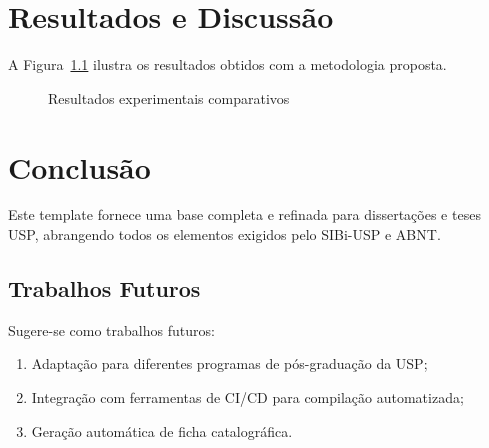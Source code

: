 \documentclass[
    12pt,                   %
    a4paper,                %
    openright,              %
    oneside,                %
    english,                %
    brazil                  %
]{abntex2}
\theoremstyle{plain}
\theoremstyle{definition}
\theoremstyle{remark}
\begin{document}
\chapter{Resultados e Discuss\~ao}
\label{chap:result}

A Figura~\ref{fig:resultados} ilustra os resultados obtidos
com a metodologia proposta.

\begin{figure}[htbp]
\centering
\vspace{2cm}
\begin{minipage}{0.7\textwidth}
\centering
{}
\end{minipage}
\caption{Resultados experimentais comparativos}
\label{fig:resultados}
\end{figure}

\chapter{Conclus\~ao}
\label{chap:conc}

Este template fornece uma base completa e refinada para
disserta\c{c}\~oes e teses USP, abrangendo todos os
elementos exigidos pelo SIBi-USP e ABNT.

\section*{Trabalhos Futuros}

Sugere-se como trabalhos futuros:
\begin{enumerate}
    \item Adapta\c{c}\~ao para diferentes programas de
        p\'os-gradua\c{c}\~ao da USP;
    \item Integra\c{c}\~ao com ferramentas de CI/CD para
        compila\c{c}\~ao automatizada;
    \item Gera\c{c}\~ao autom\'atica de ficha catalogr\'afica.
\end{enumerate}


\postextual


\end{document}
